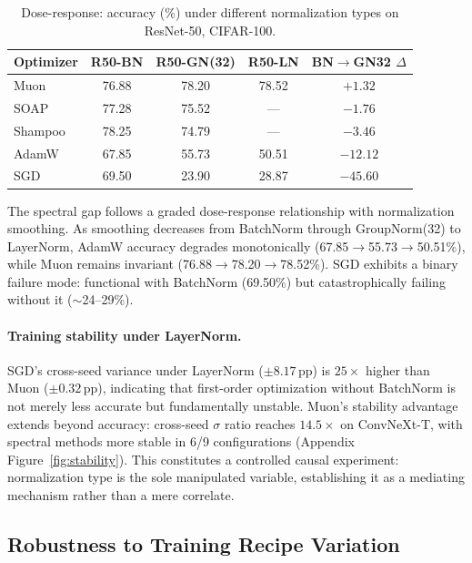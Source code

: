 \begin{table}[t]
\centering
\caption{Dose-response: accuracy (\%) under different normalization types on ResNet-50, CIFAR-100.}
\label{tab:norm_dose}
\footnotesize
\setlength{\tabcolsep}{3pt}
\begin{tabular}{lcccc}
\toprule
Optimizer & R50-BN & R50-GN(32) & R50-LN & BN$\to$GN32 $\Delta$ \\
\midrule
Muon    & 76.88 & 78.20 & 78.52 & $+1.32$ \\
SOAP    & 77.28 & 75.52 & ---   & $-1.76$ \\
Shampoo & 78.25 & 74.79 & ---   & $-3.46$ \\
AdamW   & 67.85 & 55.73 & 50.51 & $-12.12$ \\
SGD     & 69.50 & 23.90 & 28.87 & $-45.60$ \\
\bottomrule
\end{tabular}
\end{table}

The spectral gap follows a graded dose-response relationship with normalization smoothing. As smoothing decreases from BatchNorm through GroupNorm(32) to LayerNorm, AdamW accuracy degrades monotonically (67.85$\to$55.73$\to$50.51\%), while Muon remains invariant (76.88$\to$78.20$\to$78.52\%). SGD exhibits a binary failure mode: functional with BatchNorm (69.50\%) but catastrophically failing without it ($\sim$24--29\%).

\paragraph{Training stability under LayerNorm.}
SGD's cross-seed variance under LayerNorm ($\pm 8.17$\,pp) is $25\times$ higher than Muon ($\pm 0.32$\,pp), indicating that first-order optimization without BatchNorm is not merely less accurate but fundamentally unstable.
Muon's stability advantage extends beyond accuracy: cross-seed $\sigma$ ratio reaches $14.5\times$ on ConvNeXt-T, with spectral methods more stable in 6/9 configurations (Appendix Figure~\ref{fig:stability}).
This constitutes a controlled causal experiment: normalization type is the sole manipulated variable, establishing it as a mediating mechanism rather than a mere correlate.

\vspace{-0.5em}
\subsection{Robustness to Training Recipe Variation}
\label{sec:recipe_robustness}

